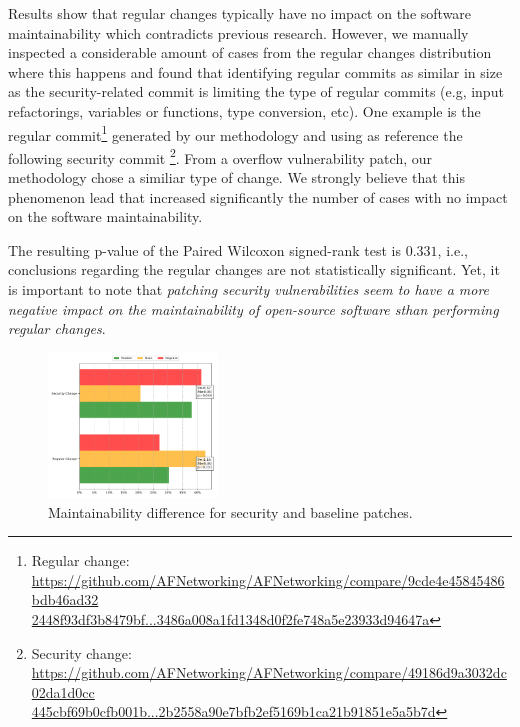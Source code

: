 \documentclass[10pt,conference]{IEEEtran}
\begin{document}
Results show that regular changes typically have no impact on the 
software maintainability which contradicts previous research.
However, we manually inspected a considerable amount of cases from
the regular changes distribution where this happens and found that 
identifying regular commits as similar in size as the security-related 
commit is limiting the type of regular commits (e.g, input 
refactorings, variables or functions, type conversion, etc).  
One example is the regular commit\footnote{Regular change: 
\url{https://github.com/AFNetworking/AFNetworking/compare/9cde4e45845486bdb46ad32
2448f93df3b8479bf...3486a008a1fd1348d0f2fe748a5e23933d94647a}} generated 
by our methodology and using as reference the following security commit
\footnote{Security change: 
\url{https://github.com/AFNetworking/AFNetworking/compare/49186d9a3032dc02da1d0cc
445cbf69b0cfb001b...2b2558a90e7bfb2ef5169b1ca21b91851e5a5b7d}}. From a
overflow vulnerability patch, our methodology chose a similiar
type of change. We strongly believe that this phenomenon lead
that increased significantly the number of cases with no impact
on the software maintainability.

The resulting p-value of the Paired Wilcoxon signed-rank test is $0.331$, i.e., 
conclusions regarding the regular changes are not statistically significant. 
Yet, it is important to note that \emph{patching security vulnerabilities seem 
to have a more negative impact on the maintainability of open-source software 
sthan performing regular changes}.

\begin{figure}[h]	
 	\centering 	\includegraphics[width=0.4\textwidth]{figures/main_comparison.pdf}
 	\caption{Maintainability difference for security and baseline patches.}
	\label{fig:secvsreg}
\end{figure}
\end{document}
